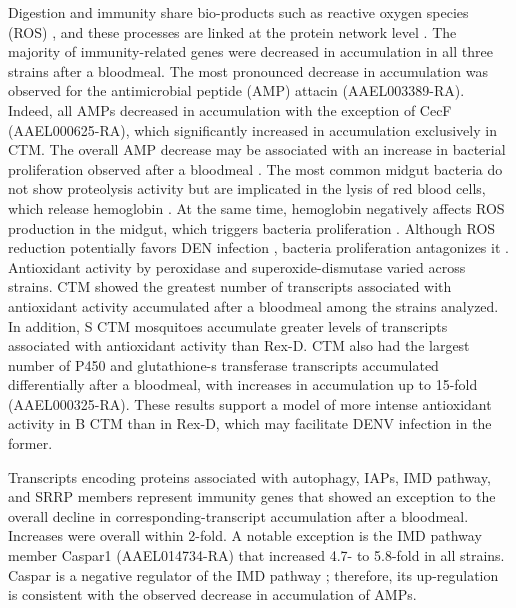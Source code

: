 Digestion and immunity share bio-products such as \gls{reactive oxygen species (ROS)} \cite{Molina-Cruz2008}, and these processes are linked at the protein network level \cite{Guo2010}. The majority of immunity-related genes were decreased in accumulation in all three strains after a bloodmeal. The most pronounced decrease in accumulation was observed for the antimicrobial peptide (\gls{AMP}) attacin (AAEL003389-RA). Indeed, all AMPs decreased in accumulation with the exception of CecF (AAEL000625-RA), which significantly increased in accumulation exclusively in CTM. The overall AMP decrease may be associated with an increase in bacterial proliferation observed after a bloodmeal \cite{Oliveira2011}. The most common midgut bacteria do not show proteolysis activity but are implicated in the lysis of red blood cells, which release hemoglobin \cite{Gaio2011}. At the same time, hemoglobin negatively affects ROS production in the midgut, which triggers bacteria proliferation \cite{Oliveira2011}. Although ROS reduction potentially favors DEN infection \cite{Oliveira2011}, bacteria proliferation antagonizes it \cite{Xi2008}. Antioxidant activity by peroxidase and superoxide-dismutase varied across strains. CTM showed the greatest number of transcripts associated with antioxidant activity accumulated after a bloodmeal among the strains analyzed. In addition, S CTM mosquitoes accumulate greater levels of transcripts associated with antioxidant activity than Rex-D. CTM also had the largest number of P450 and glutathione-s transferase transcripts accumulated differentially after a bloodmeal, with increases in accumulation up to 15-fold (AAEL000325-RA). These results support a model of more intense antioxidant activity in B CTM than in Rex-D, which may facilitate DENV infection in the former.

Transcripts encoding proteins associated with autophagy, IAPs, IMD pathway, and SRRP members represent immunity genes that showed an exception to the overall decline in corresponding-transcript accumulation after a bloodmeal. Increases were overall within 2-fold. A notable exception is the IMD pathway member Caspar1 (AAEL014734-RA) that increased 4.7- to 5.8-fold in all strains. Caspar is a negative regulator of the IMD pathway \cite{Kim2006caspar}; therefore, its up-regulation is consistent with the observed decrease in accumulation of AMPs.

